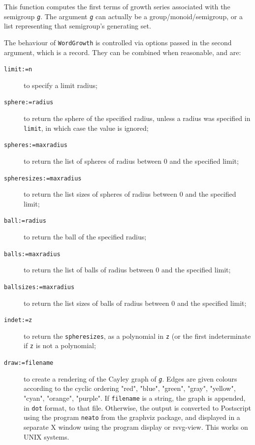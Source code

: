 \documentclass[a4paper,11pt]{report}
\begin{document}
{{{ This function computes the first terms of growth series associated with the
semigroup \mbox{\texttt{\mdseries\slshape g}}. The argument \mbox{\texttt{\mdseries\slshape g}} can actually be a group/monoid/semigroup, or a list representing that
semigroup's generating set. 

 The behaviour of \texttt{WordGrowth} is controlled via options passed in the second argument, which is a record.
They can be combined when reasonable, and are: 
\begin{description}
\item[{\texttt{limit:=n}}]  to specify a limit radius;
\item[{\texttt{sphere:=radius}}]  to return the sphere of the specified radius, unless a radius was specified in \texttt{limit}, in which case the value is ignored;
\item[{\texttt{spheres:=maxradius}}]  to return the list of spheres of radius between 0 and the specified limit;
\item[{\texttt{spheresizes:=maxradius}}]  to return the list sizes of spheres of radius between 0 and the specified
limit;
\item[{\texttt{ball:=radius}}]  to return the ball of the specified radius;
\item[{\texttt{balls:=maxradius}}]  to return the list of balls of radius between 0 and the specified limit;
\item[{\texttt{ballsizes:=maxradius}}]  to return the list sizes of balls of radius between 0 and the specified limit;
\item[{\texttt{indet:=z}}]  to return the \texttt{spheresizes}, as a polynomial in \texttt{z} (or the first indeterminate if \texttt{z} is not a polynomial;
\item[{\texttt{draw:=filename}}]  to create a rendering of the Cayley graph of \mbox{\texttt{\mdseries\slshape g}}. Edges are given colours according to the cyclic ordering "red", "blue",
"green", "gray", "yellow", "cyan", "orange", "purple". If \texttt{filename} is a string, the graph is appended, in \texttt{dot} format, to that file. Otherwise, the output is converted to Postscript using
the program \texttt{neato} from the \textsf{graphviz} package, and displayed in a separate X window using the program \textsf{display} or \textsf{rsvg-view}. This works on UNIX systems. 


\end{description}}}}
\end{document}
